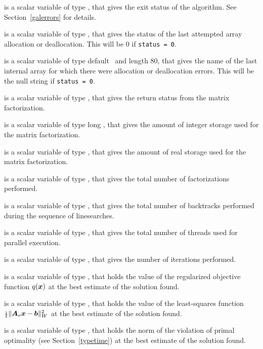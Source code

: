 \documentclass{galahad}
\begin{document}
\begin{description}

 is a scalar variable of type \integer, that gives the
exit status of the algorithm.
See Section~\ref{galerrors}
for details.

 is a scalar variable of type \integer, that gives
the status of the last attempted array allocation or deallocation.
This will be 0 if {\tt status = 0}.

 is a scalar variable of type default \character\
and length 80, that  gives the name of the last internal array
for which there were allocation or deallocation errors.
This will be the null string if {\tt status = 0}.

 is a scalar variable of type \integer, that
gives the return status from the matrix factorization.

 is a scalar variable of type long
\integer, that gives the amount of integer storage used for the matrix
factorization.

 is a scalar variable of type \longinteger,
that gives the amount of real storage used for the matrix factorization.

 is a scalar variable of type \integer, that gives the
total number of factorizations performed.

 is a scalar variable of type \integer, that gives the
total number of backtracks performed during the sequence of linesearches.

 is a scalar variable of type \integer, that gives the
total number of threads used for parallel execution.

 is a scalar variable of type \integer, that
gives the number of iterations performed.

 is a scalar variable of type \realdp, that holds the
value of the regularized objective function $q({\bm{x}})$ at the 
best estimate of the solution found.

 is a scalar variable of type \realdp, that holds the value of 
the least-squares function ${\scriptstyle \frac{1}{2}} \| {\bm{A}}_o {\bm{x}} - {\bm{b}}\|_W^2$ 
at the best estimate of the solution found.

 is a scalar variable of type \realdp,
that holds the norm of the violation of primal optimality
(see Section~\ref{typetime}) at the best estimate of the solution found.


\end{description}
\end{document}
